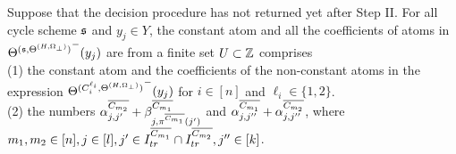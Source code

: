 \begin{lemma}\label{prop-bnd-domain-2}
Suppose that the decision procedure has not returned yet after Step II. 
For all cycle scheme ${\mathfrak{s} }$ and $y_j \in Y$, the constant atom and all the coefficients of atoms in ${\Theta^{({\mathfrak{s} }, \Theta^{(H,\Omega_\bot)})}}^-(y_j)$ are from a finite set $U \subset {\mathbb{Z} }$ comprises\\ (1)
the constant atom and the coefficients of the non-constant atoms in the expression ${\Theta^{(C^{\ell_i}_{i}, \Theta^{(H,\Omega_\bot)})}}^-(y_j)$ for $i\in [n]$ and $\ell_i \in \{1,2\}$.\smallskip\\(2) the numbers $\alpha^{\overline{C_{m_2}}}_{j,j'} + \beta^{\overline{C_{m_1}}}_{j,\pi^{\overline{C_{m_1}}}(j')}$ and $\alpha^{\overline{C_{m_1}}}_{j, j''} + \alpha^{\overline{C_{m_2}}}_{j,j''}$, where  $m_1,m_2 \in [n], j\in[l],j' \in I^{\overline{C_{m_1}}}_{tr} \cap I^{\overline{C_{m_2}}}_{tr},  j'' \in [k]$. 

\end{lemma}

